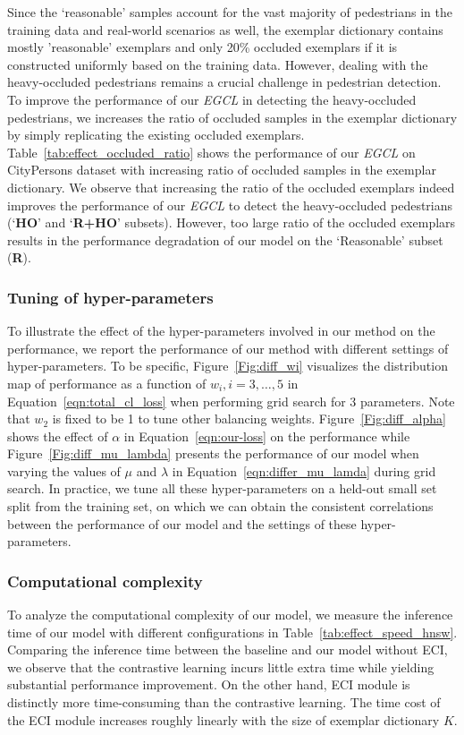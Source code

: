 \documentclass[journal]{IEEEtran}
\begin{document}
Since the `reasonable' samples account for the vast majority of pedestrians in the training data and real-world scenarios as well, the exemplar dictionary contains mostly 'reasonable' exemplars and only 20\% occluded exemplars if it is constructed uniformly based on the training data. However, dealing with the heavy-occluded pedestrians remains a crucial challenge in pedestrian detection. To improve the performance of our \emph{EGCL} in detecting the heavy-occluded pedestrians, we increases the ratio of occluded samples in the exemplar dictionary by simply replicating the existing occluded exemplars. Table~\ref{tab:effect_occluded_ratio} shows the performance of our \emph{EGCL} on CityPersons dataset with increasing ratio of occluded samples in the exemplar dictionary. We observe that increasing the ratio of the occluded exemplars indeed improves the performance of our \emph{EGCL} to detect the heavy-occluded pedestrians (`\textbf{HO}' and `\textbf{R+HO}' subsets). However, too large ratio of the occluded exemplars results in the performance degradation of our model on the `Reasonable' subset (\textbf{R}). 







\subsubsection{\textbf{Tuning of hyper-parameters}}
To illustrate the effect of the hyper-parameters involved in our method on the performance, we report the performance of our method with different settings of hyper-parameters. To be specific, Figure~\ref{Fig:diff_wi} visualizes the distribution map of performance as a function of $w_i, i=3, \dots, 5$ in Equation~\ref{eqn:total_cl_loss} when performing grid search for 3 parameters. Note that $w_2$ is fixed to be 1 to tune other balancing weights. Figure~\ref{Fig:diff_alpha} shows the effect of $\alpha$ in Equation~\ref{eqn:our-loss} on the performance while Figure~\ref{Fig:diff_mu_lambda} presents the performance of our model when varying the values of $\mu$ and $\lambda$ in Equation~\ref{eqn:differ_mu_lamda} during grid search. In practice, we tune all these hyper-parameters on a held-out small set split from the training set, on which we can obtain the consistent correlations between the performance of our model and the settings of these hyper-parameters.

\subsubsection{\textbf{Computational complexity}} 
To analyze the computational complexity of our model, we measure the inference time of our model with different configurations in Table~\ref{tab:effect_speed_hnsw}. Comparing the inference time between the baseline and our model without ECI, we observe that the contrastive learning incurs little extra time while yielding substantial performance improvement. On the other hand, ECI module is distinctly more time-consuming than the contrastive learning. The time cost of the ECI module increases roughly linearly with the size of exemplar dictionary $K$.
\end{document}
